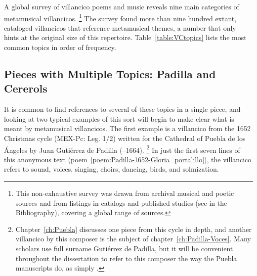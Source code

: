 A global survey of villancico poems and music reveals nine main categories of metamusical villancicos.%
	\footnote{%
	This non-exhaustive survey was drawn from archival musical and poetic sources and from listings in catalogs and published studies (see  in the Bibliography), covering a global range of sources.
	}
The survey found more than nine hundred extant, cataloged villancicos that reference metamusical themes, a number that only hints at the original size of this repertoire.
Table~\ref{table:VCtopics} lists the most common topics in order of frequency.

%	
%
\subsection{%
Pieces with Multiple Topics: Padilla and Cererols
}

It is common to find references to several of these topics in a single piece, and looking at two typical examples of this sort will begin to make clear what is meant by metamusical villancicos.
The first example is a villancico from the 1652 Christmas cycle (MEX-Pc: Leg. 1/2) written for the Cathedral of Puebla de los Ángeles by Juan Gutiérrez de Padilla (--1664).%
	\footnote{%
	Chapter~\ref{ch:Puebla} discusses one piece from this cycle in depth, and another villancico by this composer is the subject of chapter~\ref{ch:Padilla-Voces}.
	Many scholars use full surname Gutiérrez de Padilla, but it will be convenient throughout the dissertation to refer to this composer the way the Puebla manuscripts do, as simply .
	}
In just the first seven lines of this anonymous text (poem~\ref{poem:Padilla-1652-Gloria_portalillo}), the villancico refers to sound, voices, singing, choirs, dancing, birds, and solmization.

